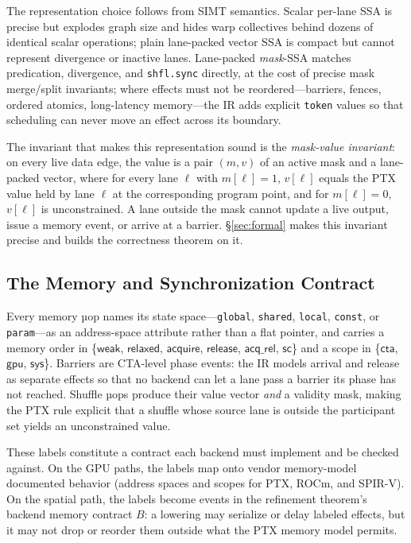 \documentclass[sigplan,nonacm]{acmart}
\begin{document}
The representation choice follows from SIMT semantics.  Scalar per-lane SSA
is precise but explodes graph size and hides warp collectives behind dozens
of identical scalar operations; plain lane-packed vector SSA is compact but
cannot represent divergence or inactive lanes.  Lane-packed \emph{mask}-SSA
matches predication, divergence, and \texttt{shfl.sync} directly, at the
cost of precise mask merge/split invariants; where effects must not be
reordered---barriers, fences, ordered atomics, long-latency memory---the IR
adds explicit \texttt{token} values so that scheduling can never move an
effect across its boundary.

The invariant that makes this representation sound is the \emph{mask-value
invariant}: on every live data edge, the value is a pair $(m, v)$ of an
active mask and a lane-packed vector, where for every lane $\ell$ with
$m[\ell]=1$, $v[\ell]$ equals the PTX value held by lane $\ell$ at the
corresponding program point, and for $m[\ell]=0$, $v[\ell]$ is
unconstrained.  A lane outside the mask cannot update a live output, issue a
memory event, or arrive at a barrier.  \S\ref{sec:formal} makes this
invariant precise and builds the correctness theorem on it.

\subsection{The Memory and Synchronization Contract}
\label{sec:ir-memory}

Every memory µop names its state space---\texttt{global},
\texttt{shared}, \texttt{local}, \texttt{const}, or \texttt{param}---as an
address-space attribute rather than a flat pointer, and carries a memory
order in \{$\mathsf{weak}$, $\mathsf{relaxed}$, $\mathsf{acquire}$,
$\mathsf{release}$, $\mathsf{acq\_rel}$, $\mathsf{sc}$\} and a scope in
\{$\mathsf{cta}$, $\mathsf{gpu}$, $\mathsf{sys}$\}.  Barriers are CTA-level
phase events: the IR models arrival and release as separate effects so that
no backend can let a lane pass a barrier its phase has not reached.  Shuffle
µops produce their value vector \emph{and} a validity mask, making the
PTX rule explicit that a shuffle whose source lane is outside the participant
set yields an unconstrained value.

These labels constitute a contract each backend must implement and be
checked against.  On the GPU paths, the labels map onto vendor memory-model
documented behavior (address spaces and scopes for PTX, ROCm, and SPIR-V).
On the spatial path, the labels become events in the refinement theorem's
backend memory contract $B$: a lowering may serialize or delay labeled
effects, but it may not drop or reorder them outside what the PTX memory
model permits.
\end{document}

